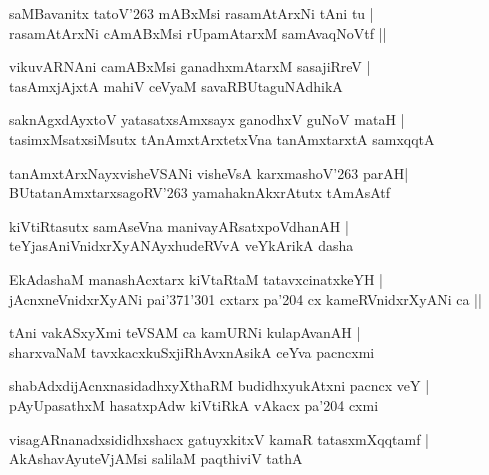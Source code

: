 \documentclass[twoside,12pt,openright]{book}
\newcounter{shloka}[chapter]
\begin{document}
\begin{shloka}
saMBavanitx tatoV\char'263 mABxMsi rasamAtArxNi tAni tu |\\
rasamAtArxNi cAmABxMsi rUpamAtarxM samAvaqNoVtf ||
\end{shloka}

\begin{shloka}
vikuvARNAni camABxMsi ganadhxmAtarxM sasajiRreV |\\
tasAmxjAjxtA mahiV ceVyaM savaRBUtaguNAdhikA 
\end{shloka}

\begin{shloka}
saknAgxdAyxtoV yatasatxsAmxsayx ganodhxV guNoV mataH |\\
tasimxMsatxsiMsutx tAnAmxtArxtetxVna tanAmxtarxtA samxqqtA
\end{shloka}

\begin{shloka}
tanAmxtArxNayxvisheVSANi visheVsA karxmashoV\char'263 parAH|\\
BUtatanAmxtarxsagoRV\char'263 yamahaknAkxrAtutx tAmAsAtf
\end{shloka}

\begin{shloka}
kiVtiRtasutx samAseVna manivayARsatxpoVdhanAH |\\
teYjasAniVnidxrXyANAyxhudeRVvA veYkArikA dasha
\end{shloka}

\begin{shloka}
EkAdashaM manashAcxtarx kiVtaRtaM tatavxcinatxkeYH |\\
jAcnxneVnidxrXyANi pai\char'371\char'301 cxtarx pa\char'204 cx kameRVnidxrXyANi ca ||
\end{shloka}

\begin{shloka}
tAni vakASxyXmi teVSAM ca kamURNi kulapAvanAH |\\
sharxvaNaM tavxkacxkuSxjiRhAvxnAsikA ceYva pacncxmi
\end{shloka}

\begin{shloka}
shabAdxdijAcnxnasidadhxyXthaRM budidhxyukAtxni pacncx veY |\\
pAyUpasathxM hasatxpAdw kiVtiRkA vAkacx pa\char'204 cxmi
\end{shloka}

\begin{shloka}
visagARnanadxsididhxshacx gatuyxkitxV kamaR tatasxmXqqtamf |\\
AkAshavAyuteVjAMsi salilaM paqthiviV tathA
\end{shloka}
\end{document}
